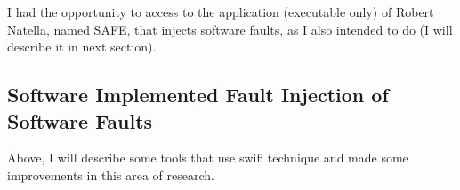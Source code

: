 




I had the opportunity to access to the application (executable only)
of Robert Natella, named SAFE, that injects software faults, as I also intended to do (I will describe it in next section).

\clearpage
\subsection{Software Implemented Fault Injection of Software Faults}

Above, I will describe some tools that use \ac{swifi} technique and made some improvements in this area of research.




